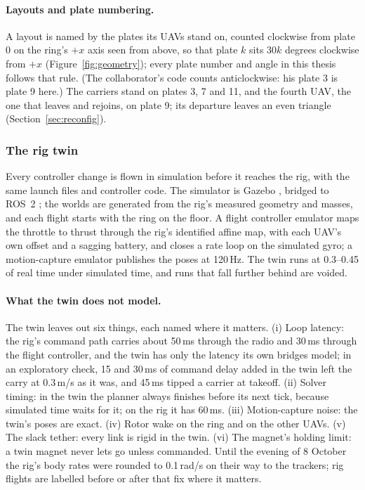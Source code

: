 \paragraph{Layouts and plate numbering.} A layout is named by the plates its UAVs stand on, counted clockwise
from plate 0 on the ring's $+x$ axis seen from above, so that plate $k$ sits $30k$ degrees clockwise from $+x$
(Figure~\ref{fig:geometry}); every plate number and angle in this thesis follows that rule. (The collaborator's
code counts anticlockwise: his plate 3 is plate 9 here.) The carriers stand on plates 3, 7 and 11, and the fourth
UAV, the one that leaves and rejoins, on plate 9; its departure leaves an even triangle
(Section~\ref{sec:reconfig}).




\subsubsection{The rig twin}
\label{sec:simulation}

Every controller change is flown in simulation before it reaches the rig, with the same launch files and controller
code. The simulator is Gazebo \cite{koenig2004gazebo}, bridged to ROS~2 \cite{macenski2022ros2}; the worlds are
generated from the rig's measured geometry and masses, and each flight starts with the ring on the floor. A flight
controller emulator maps the throttle to thrust through the rig's identified affine map, with each UAV's own offset
and a sagging battery, and closes a rate loop on the simulated gyro; a motion-capture emulator publishes the poses at
120\,Hz. The twin runs at 0.3--0.45 of real time under simulated time, and runs that fall further behind are voided.

\paragraph{What the twin does not model.} The twin leaves out six things, each named where it matters. (i) Loop latency: the rig's
command path carries about 50\,ms through the radio and 30\,ms through the flight controller, and the twin has only
the latency its own bridges model; in an exploratory check, 15 and 30\,ms of command delay added in the twin left the carry at 0.3\,m/s
as it was, and 45\,ms tipped a carrier at takeoff. (ii) Solver
timing: in the twin the planner always finishes before its next tick, because simulated time waits for it; on the
rig it has 60\,ms. (iii) Motion-capture noise: the twin's poses are exact. (iv) Rotor wake on the ring and on the
other UAVs. (v) The slack tether: every link is rigid in the twin. (vi) The magnet's holding limit: a twin magnet
never lets go unless commanded. Until the evening of 8 October the rig's body rates were rounded to 0.1\,rad/s on their way to the
trackers; rig flights are labelled before or after that fix where it matters.

